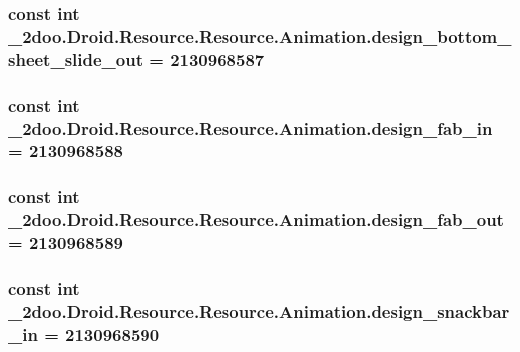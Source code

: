 \hypertarget{class__2doo_1_1_droid_1_1_resource_1_1_animation_e50a4b523ff92abed12b49985d03f282}{
\subsubsection[{design\_\-bottom\_\-sheet\_\-slide\_\-out}]{\setlength{\rightskip}{0pt plus 5cm}const int \_\-2doo.Droid.Resource.Resource.Animation.design\_\-bottom\_\-sheet\_\-slide\_\-out = 2130968587}}
\label{class__2doo_1_1_droid_1_1_resource_1_1_animation_e50a4b523ff92abed12b49985d03f282}


\hypertarget{class__2doo_1_1_droid_1_1_resource_1_1_animation_95910bb66e23739c0cdf494c58acbea2}{
\subsubsection[{design\_\-fab\_\-in}]{\setlength{\rightskip}{0pt plus 5cm}const int \_\-2doo.Droid.Resource.Resource.Animation.design\_\-fab\_\-in = 2130968588}}
\label{class__2doo_1_1_droid_1_1_resource_1_1_animation_95910bb66e23739c0cdf494c58acbea2}


\hypertarget{class__2doo_1_1_droid_1_1_resource_1_1_animation_8b59c2b886c71df53ce439fd3fdce2ef}{
\subsubsection[{design\_\-fab\_\-out}]{\setlength{\rightskip}{0pt plus 5cm}const int \_\-2doo.Droid.Resource.Resource.Animation.design\_\-fab\_\-out = 2130968589}}
\label{class__2doo_1_1_droid_1_1_resource_1_1_animation_8b59c2b886c71df53ce439fd3fdce2ef}


\hypertarget{class__2doo_1_1_droid_1_1_resource_1_1_animation_0d67f4ef7ce2d5b25f689767e6943135}{
\subsubsection[{design\_\-snackbar\_\-in}]{\setlength{\rightskip}{0pt plus 5cm}const int \_\-2doo.Droid.Resource.Resource.Animation.design\_\-snackbar\_\-in = 2130968590}}
\label{class__2doo_1_1_droid_1_1_resource_1_1_animation_0d67f4ef7ce2d5b25f689767e6943135}


